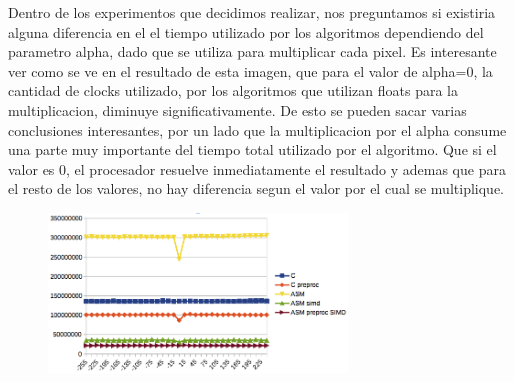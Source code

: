 Dentro de los experimentos que decidimos realizar, nos preguntamos si existiria alguna diferencia en el el tiempo utilizado por los algoritmos dependiendo del parametro alpha, dado que se utiliza para multiplicar cada pixel.
Es interesante ver como se ve en el resultado de esta imagen, que para el valor de alpha=0, la cantidad de clocks utilizado, por los algoritmos que utilizan floats para la multiplicacion, diminuye significativamente. 
De esto se pueden sacar varias conclusiones interesantes, por un lado que la multiplicacion por el alpha consume una parte muy importante del tiempo total utilizado por el algoritmo.
Que si el valor es 0, el procesador resuelve inmediatamente el resultado y ademas que para el resto de los valores, no hay diferencia segun el valor por el cual se multiplique.

\begin{figure}[!h]
	\centering
\includegraphics[width=300px]{imgs/comparacionLDR.png}
\end{figure}

